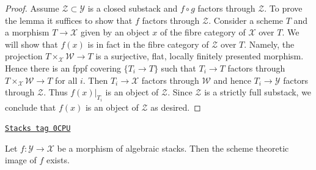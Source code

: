 \begin{proof}
Assume $\mathcal{Z} \subset \mathcal{Y}$
is a closed substack and $f \circ g$ factors through $\mathcal{Z}$.
To prove the lemma it suffices to show
that $f$ factors through $\mathcal{Z}$.
Consider a scheme $T$ and a morphism $T \to \mathcal{X}$
given by an object $x$ of the fibre category of $\mathcal{X}$ over $T$.
We will show that $f(x)$ is in fact in the fibre category of $\mathcal{Z}$
over $T$. Namely, the projection $T \times_\mathcal{X} \mathcal{W} \to T$
is a surjective, flat, locally finitely presented morphism.
Hence there is an fppf covering $\{T_i \to T\}$ such that
$T_i \to T$ factors through $T \times_\mathcal{X} \mathcal{W} \to T$
for all $i$. Then $T_i \to \mathcal{X}$ factors through $\mathcal{W}$
and hence $T_i \to \mathcal{Y}$ factors through $\mathcal{Z}$.
Thus $f(x)|_{T_i}$ is an object of $\mathcal{Z}$.
Since $\mathcal{Z}$ is a strictly full substack, we conclude
that $f(x)$ is an object of $\mathcal{Z}$ as desired.
\end{proof}

\begin{lemma}
\label{stacks-morphisms-lemma-scheme-theoretic-image-existence}
\href{https://stacks.math.columbia.edu/tag/0CPU}{\texttt{Stacks tag 0CPU}}

Let $f : \mathcal{Y} \to \mathcal{X}$ be a morphism of algebraic stacks.
Then the scheme theoretic image of $f$ exists.
\end{lemma}

